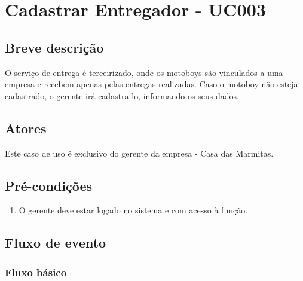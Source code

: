 \chapter{Cadastrar Entregador - UC003} \label{uc003}

\section{Breve descrição}

O serviço de entrega é terceirizado, onde os motoboys são vinculados a uma empresa e recebem apenas pelas entregas realizadas. Caso o motoboy não esteja cadastrado, o gerente irá cadastra-lo, informando os seus dados.

\section{Atores}

Este caso de uso é exclusivo do gerente da empresa - Casa das Marmitas.

\section{Pré-condições}

\begin{enumerate}
	\item O gerente deve estar logado no sistema e com acesso à função.
\end{enumerate}

\section{Fluxo de evento}

\subsection{Fluxo básico}

